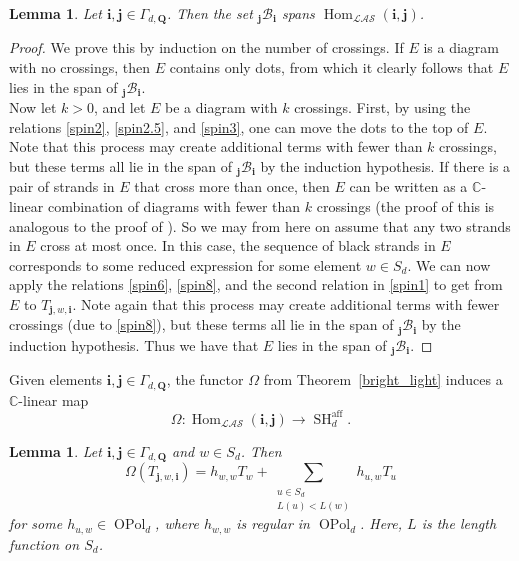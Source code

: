 \documentclass[11pt]{amsart}
\newtheorem{lem}[theo]{Lemma}
\theoremstyle{definition}
\numberwithin{equation}{section}
\begin{document}
\begin{lem} \label{greenpen}
Let $ \mathbf{i}, \mathbf{j} \in \Gamma_{d,\mathbf{Q}} $. Then the set $ _{\mathbf{j}} \mathcal{B}_{\mathbf{i}} $ spans $ \operatorname{Hom}_{\mathcal{LAS}}(\mathbf{i}, \mathbf{j}) $.
\end{lem}


\begin{proof}
We prove this by induction on the number of crossings. If \(E\) is a diagram with no crossings, then \(E\) contains only dots, from which it clearly follows that \(E\) lies in the span of $ _{\mathbf{j}} \mathcal{B}_{\mathbf{i}} $.
\\ \indent Now let $ k > 0 $, and let \(E\) be a diagram with \(k\) crossings. First, by using the relations \cref{spin2}, \cref{spin2.5}, and \cref{spin3}, one can move the dots to the top of \(E\). Note that this process may create additional terms with fewer than \(k\) crossings, but these terms all lie in the span of $ _{\mathbf{j}} \mathcal{B}_{\mathbf{i}} $ by the induction hypothesis. If there is a pair of strands in \(E\) that cross more than once, then \(E\) can be written as a $ \mathbb{C} $-linear combination of diagrams with fewer than $ k $ crossings (the proof of this is analogous to the proof of \cite[Lem.~4.10(3)]{Webster}). So we may from here on assume that any two strands in \(E\) cross at most once. In this case, the sequence of black strands in \(E\) corresponds to some reduced expression for some element $ w \in S_{d} $. We can now apply the relations \cref{spin6}, \cref{spin8}, and the second relation in \cref{spin1} to get from \(E\) to $ T_{\mathbf{j},w,\mathbf{i}} $. Note again that this process may create additional terms with fewer crossings (due to \cref{spin8}), but these terms all lie in the span of $ _{\mathbf{j}} \mathcal{B}_{\mathbf{i}} $ by the induction hypothesis. Thus we have that \(E\) lies in the span of $ _{\mathbf{j}} \mathcal{B}_{\mathbf{i}} $.
\end{proof}

Given elements $ \mathbf{i}, \mathbf{j} \in \Gamma_{d,\mathbf{Q}} $, the functor $ \Omega $ from Theorem~\ref{bright_light} induces a $ \mathbb{C} $-linear map 
\begin{equation*}
\Omega \colon \operatorname{Hom}_{\mathcal{LAS}}(\mathbf{i}, \mathbf{j}) \rightarrow \operatorname{SH}_{d}^{\operatorname{aff}}.
\end{equation*}


\begin{lem} \label{cactus2_1123}
Let $ \mathbf{i}, \mathbf{j} \in \Gamma_{d,\mathbf{Q}} $ and $ w \in S_{d} $. Then
\begin{equation} \label{cactus_1123}
\Omega(T_{\mathbf{j},w,\mathbf{i}}) = h_{w,w}T_{w} + \sum_{\substack{u \in S_{d} \\ L(u) < L(w)}} h_{u,w}T_{u}
\end{equation}
for some $ h_{u,w} \in \operatorname{OPol}_{d}$, where $ h_{w,w} $ is regular in $ \operatorname{OPol}_{d} $. Here, \(L\) is the length function on $ S_{d} $.
\end{lem}
\end{document}
